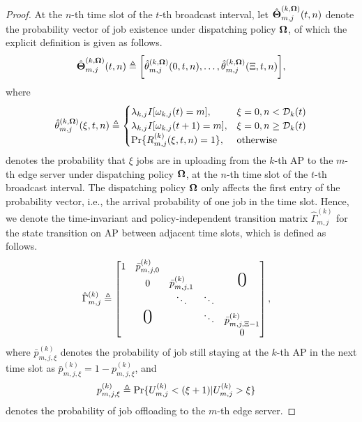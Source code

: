 \begin{proof}
    At the $n$-th time slot of the $t$-th broadcast interval, let $\hat{\boldsymbol{\Theta}}^{(k,\boldsymbol{\Omega})}_{m,j}(t,n)$ denote the probability vector of job existence under dispatching policy $\boldsymbol{\Omega}$, of which the explicit definition is given as follows.
    \begin{align}
        \hat{\boldsymbol{\Theta}}^{(k,\boldsymbol{\Omega})}_{m,j}(t,n) \triangleq \bigg[
            \hat{\theta}^{(k,\boldsymbol{\Omega})}_{m,j}(0,t,n),
            \dots,
            \hat{\theta}^{(k,\boldsymbol{\Omega})}_{m,j}(\Xi,t,n)
        \bigg],
    \end{align}
    where
    \begin{align}
        \hat{\theta}^{(k,\boldsymbol{\Omega})}_{m,j}(\xi,t,n) \triangleq
        \begin{cases}
            \lambda_{k,j} I[\omega_{k,j}(t)=m], &\xi=0, n < \mathcal{D}_{k}(t)
            \\
            \lambda_{k,j} I[\omega_{k,j}(t+1)=m], &\xi=0, n \geq \mathcal{D}_{k}(t) 
            \\
            \Pr\{R^{(k)}_{m,j}(\xi,t,n)=1\}, & \text{otherwise}
        \end{cases}
    \end{align}
    denotes the probability that $\xi$ jobs are in uploading from the $k$-th AP to the $m$-th edge server under dispatching policy $\boldsymbol{\Omega}$, at the $n$-th time slot of the $t$-th broadcast interval.
    The dispatching policy $\boldsymbol{\Omega}$ only affects the first entry of the probability vector, i.e., the arrival probability of one job in the time slot.
    Hence, we denote the time-invariant and policy-independent transition matrix $\hat{\Gamma}^{(k)}_{m,j}$ for the state transition on AP between adjacent time slots, which is defined as follows.
    \begin{align}
        \hat{\Gamma}^{(k)}_{m,j} &\define
        \begin{bmatrix}
            1 & \bar{p}^{(k)}_{m,j,0} &                       &        &                           \\
            & 0                     & \bar{p}^{(k)}_{m,j,1} &        & \text{\huge0}             \\
            &                       & \ddots                & \ddots &                           \\
            & \text{\huge0}         &                       & \ddots & \bar{p}^{(k)}_{m,j,\Xi-1} \\
            &                       &                       &        & 0                         \\
        \end{bmatrix},
    \end{align}
    where $\bar{p}^{(k)}_{m,j,\xi}$ denotes the probability of job still staying at the $k$-th AP in the next time slot as $\bar{p}^{(k)}_{m,j,\xi} = 1 - p^{(k)}_{m,j,\xi}$, and
    \begin{align}
        p^{(k)}_{m,j,\xi} &\triangleq \Pr\{U^{(k)}_{m,j} < (\xi+1) | U^{(k)}_{m,j}>\xi\}
    \end{align}
    denotes the probability of job offloading to the $m$-th edge server.


\end{proof}
